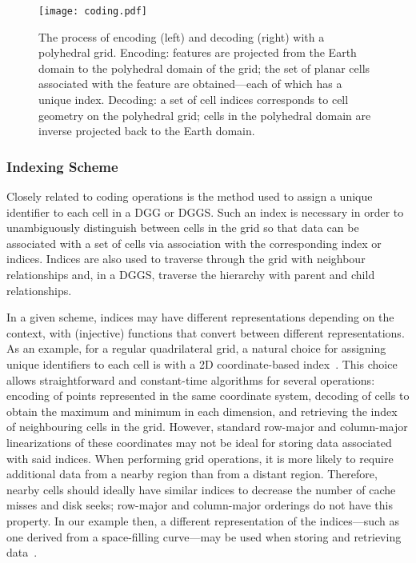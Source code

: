 \begin{figure}[ht!]
	\centering
	\texttt{[image: coding.pdf]}
	\caption[Grid encoding and decoding with a polyhedral grid]{
		The process of encoding (left) and decoding (right) with a polyhedral grid.
		Encoding: features are projected from the Earth domain to the polyhedral domain of the grid; the set of planar cells associated with the feature are obtained---each of which has a unique index.
		Decoding: a set of cell indices corresponds to cell geometry on the polyhedral grid; cells in the polyhedral domain are inverse projected back to the Earth domain.
	}
	\label{fig:coding}
\end{figure}


\subsubsection{Indexing Scheme} \label{chap:2:indexing}
Closely related to coding operations is the method used to assign a unique identifier to each cell in a DGG or DGGS.
Such an index is necessary in order to unambiguously distinguish between cells in the grid so that data can be associated with a set of cells via association with the corresponding index or indices.
Indices are also used to traverse through the grid with neighbour relationships and, in a DGGS, traverse the hierarchy with parent and child relationships.


In a given scheme, indices may have different representations depending on the context, with (injective) functions that convert between different representations.
As an example, for a regular quadrilateral grid, a natural choice for assigning unique identifiers to each cell is with a 2D coordinate-based index~\cite{mahdavi2015survey}.
This choice allows straightforward and constant-time algorithms for several operations: encoding of points represented in the same coordinate system, decoding of cells to obtain the maximum and minimum in each dimension, and retrieving the index of neighbouring cells in the grid.
However, standard row-major and column-major linearizations of these coordinates may not be ideal for storing data associated with said indices.
When performing grid operations, it is more likely to require additional data from a nearby region than from a distant region.
Therefore, nearby cells should ideally have similar indices to decrease the number of cache misses and disk seeks; row-major and column-major orderings do not have this property.
In our example then, a different representation of the indices---such as one derived from a space-filling curve---may be used when storing and retrieving data~\cite{morton1966computer}.


